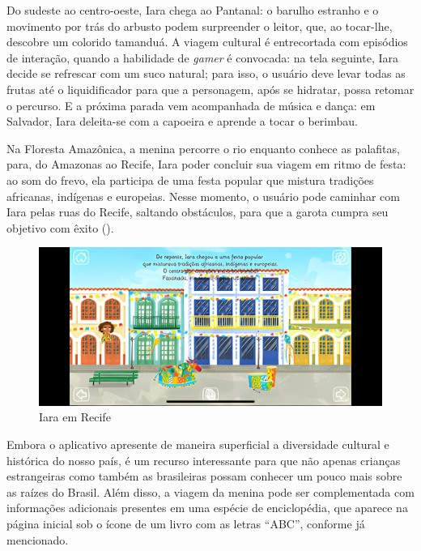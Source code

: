 \documentclass[portuguese]{textolivre}
\begin{document}
Do sudeste ao centro-oeste, Iara chega ao Pantanal: o barulho estranho e o
movimento por trás do arbusto podem surpreender o leitor, que, ao tocar-lhe,
descobre um colorido tamanduá. A viagem cultural é entrecortada com episódios
de interação, quando a habilidade de \textit{gamer} é convocada: na tela
seguinte, Iara decide se refrescar com um suco natural; para isso, o usuário
deve levar todas as frutas até o liquidificador para que a personagem, após se
hidratar, possa retomar o percurso. E a próxima parada vem acompanhada de
música e dança: em Salvador, Iara deleita-se com a capoeira e aprende a tocar o
berimbau.

Na Floresta Amazônica, a menina percorre o rio enquanto conhece as palafitas,
para, do Amazonas ao Recife, Iara poder concluir sua viagem em ritmo de festa:
ao som do frevo, ela participa de uma festa popular que mistura tradições
africanas, indígenas e europeias. Nesse momento, o usuário pode caminhar com
Iara pelas ruas do Recife, saltando obstáculos, para que a garota cumpra seu
objetivo com êxito ().

\begin{figure}[htbp]
  \centering
  \begin{minipage}{.85\textwidth}
    \includegraphics[width=\linewidth]{Fig5.jpeg}
    \caption{Iara em Recife}
    \label{fig5}
  \end{minipage}
\end{figure}

Embora o aplicativo apresente de maneira superficial a diversidade cultural e
histórica do nosso país, é um recurso interessante para que não apenas crianças
estrangeiras como também as brasileiras possam conhecer um pouco mais sobre as
raízes do Brasil. Além disso, a viagem da menina pode ser complementada com
informações adicionais presentes em uma espécie de enciclopédia, que aparece na
página inicial sob o ícone de um livro com as letras “ABC”, conforme já
mencionado.
\end{document}
